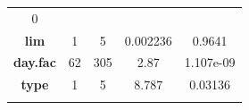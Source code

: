 \documentclass[]{article}
\begin{document}
\begin{longtable}[]{@{}ccccc@{}}
\begin{minipage}[t]{0.12\columnwidth}
0\strut
\end{minipage}\tabularnewline
\begin{minipage}[t]{0.27\columnwidth}\centering\strut
\textbf{lim}\strut
\end{minipage} & \begin{minipage}[t]{0.10\columnwidth}\centering\strut
1\strut
\end{minipage} & \begin{minipage}[t]{0.10\columnwidth}\centering\strut
5\strut
\end{minipage} & \begin{minipage}[t]{0.12\columnwidth}\centering\strut
0.002236\strut
\end{minipage} & \begin{minipage}[t]{0.12\columnwidth}\centering\strut
0.9641\strut
\end{minipage}\tabularnewline
\begin{minipage}[t]{0.27\columnwidth}\centering\strut
\textbf{day.fac}\strut
\end{minipage} & \begin{minipage}[t]{0.10\columnwidth}\centering\strut
62\strut
\end{minipage} & \begin{minipage}[t]{0.10\columnwidth}\centering\strut
305\strut
\end{minipage} & \begin{minipage}[t]{0.12\columnwidth}\centering\strut
2.87\strut
\end{minipage} & \begin{minipage}[t]{0.12\columnwidth}\centering\strut
1.107e-09\strut
\end{minipage}\tabularnewline
\begin{minipage}[t]{0.27\columnwidth}\centering\strut
\textbf{type}\strut
\end{minipage} & \begin{minipage}[t]{0.10\columnwidth}\centering\strut
1\strut
\end{minipage} & \begin{minipage}[t]{0.10\columnwidth}\centering\strut
5\strut
\end{minipage} & \begin{minipage}[t]{0.12\columnwidth}\centering\strut
8.787\strut
\end{minipage} & \begin{minipage}[t]{0.12\columnwidth}\centering\strut
0.03136\strut
\end{minipage}\tabularnewline
\begin{minipage}[t]{0.27\columnwidth}\centering\strut

\end{minipage}
\end{longtable}
\end{document}
